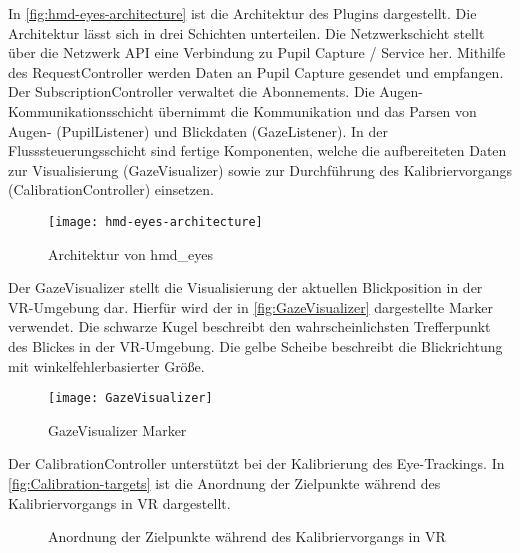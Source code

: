 In \autoref{fig:hmd-eyes-architecture} ist die Architektur des Plugins dargestellt. Die Architektur lässt sich in drei Schichten unterteilen. Die Netzwerkschicht stellt über  die Netzwerk API eine Verbindung zu Pupil Capture / Service her. Mithilfe des {\ttfamily RequestController} werden Daten an Pupil Capture gesendet und empfangen. Der {\ttfamily SubscriptionController} verwaltet die Abonnements. Die Augen-Kommunikationsschicht übernimmt die Kommunikation und das Parsen von Augen- ({\ttfamily PupilListener}) und Blickdaten ({\ttfamily GazeListener}). In der Flusssteuerungsschicht sind fertige Komponenten, welche die aufbereiteten Daten zur Visualisierung ({\ttfamily GazeVisualizer}) sowie zur Durchführung des Kalibriervorgangs ({\ttfamily CalibrationController}) einsetzen. \cite{hmd-eyes-doc.2020} 

\begin{figure}[!htbp]
	\centering
	\texttt{[image: hmd-eyes-architecture]}
	\caption[Architektur von hmd\_eyes]{Architektur von hmd\_eyes \cite{hmd-eyes-architecture.2020}}
	\label{fig:hmd-eyes-architecture}
\end{figure}

Der {\ttfamily GazeVisualizer} stellt die Visualisierung der aktuellen Blickposition in der \ac{VR}-Umgebung dar. Hierfür wird der in \autoref{fig:GazeVisualizer} dargestellte Marker verwendet. Die schwarze Kugel beschreibt den wahrscheinlichsten Trefferpunkt des Blickes in der \ac{VR}-Umgebung. Die gelbe Scheibe beschreibt die Blickrichtung mit winkelfehlerbasierter Größe. \cite{hmd-eyes-doc.2020}

\begin{figure}[!htbp]
	\centering
	\texttt{[image: GazeVisualizer]}
	\caption[GazeVisualizer Marker]{GazeVisualizer Marker}
	\label{fig:GazeVisualizer}
\end{figure}

Der {\ttfamily CalibrationController} unterstützt bei der Kalibrierung des Eye-Trackings. In \autoref{fig:Calibration-targets} ist die Anordnung der Zielpunkte während des Kalibriervorgangs in \ac{VR} dargestellt. 
\begin{figure}[!htbp]
	\centering
	\caption[Anordnung der Zielpunkte während des Kalibriervorgangs in VR]{Anordnung der Zielpunkte während des Kalibriervorgangs in \ac{VR}}
	\label{fig:Calibration-targets}
\end{figure}


